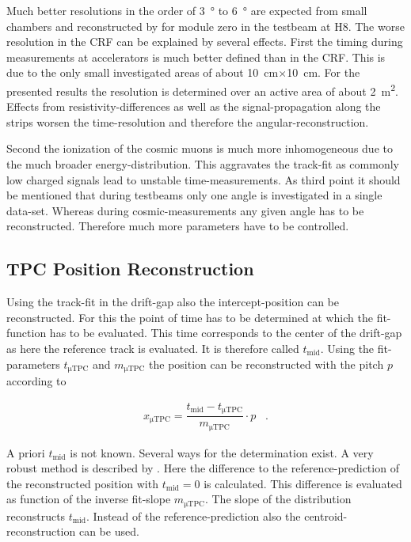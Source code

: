 \documentclass[
twoside,            %
BCOR1.4cm,          %
10pt,               %
headings=normal,    %
headsepline,        %
clearplainpage,		%
final,              %
div=14,
open=right,
bibliography=toc
]{scrreprt}
\begin{document}
Much better resolutions in the order of \SI{3}{\degree} to \SI{6}{\degree} are expected from small chambers \cite{ntekasThesis} and reconstructed by \cite{flierlThesis} for module zero in the testbeam at H8.
The worse resolution in the CRF can be explained by several effects.
First the timing during measurements at accelerators is much better defined than in the CRF.
This is due to the only small investigated areas of about \SI{10}{cm}$\times$\SI{10}{cm}.
For the presented results the resolution is determined over an active area of about \SI{2}{\square\m}.
Effects from resistivity-differences as well as the signal-propagation along the strips worsen the time-resolution and therefore the angular-reconstruction.

Second the ionization of the cosmic muons is much more inhomogeneous due to the much broader energy-distribution.
This aggravates the track-fit as commonly low charged signals lead to unstable time-measurements.
As third point it should be mentioned that during testbeams only one angle is investigated in a single data-set.
Whereas during cosmic-measurements any given angle has to be reconstructed.
Therefore much more parameters have to be controlled.

\subsection{\textmu TPC Position Reconstruction}\label{uTPCposition}

Using the track-fit in the drift-gap also the intercept-position can be reconstructed.
For this the point of time has to be determined at which the fit-function has to be evaluated.
This time corresponds to the center of the drift-gap as here the reference track is evaluated.
It is therefore called $t_{\mathrm{mid}}$.
Using the fit-parameters $t_{\si{\micro}\mathrm{TPC}}$ and $m_{\si{\micro}\mathrm{ TPC}}$ the position can be reconstructed with the pitch $p$ according to

\begin{align}
	x_{\si{\micro}\mathrm{TPC}} = \dfrac{t_{\mathrm{mid}} - t_{\si{\micro}\mathrm{TPC}}}{m_{\si{\micro}\mathrm{ TPC}}} \cdot p \;\;\; .
\end{align}

A priori $t_{\mathrm{mid}}$ is not known.
Several ways for the determination exist.
A very robust method is described by \cite{flierlThesis}. 
Here the difference to the reference-prediction of the reconstructed position with $t_{\mathrm{mid}} = 0$ is calculated.
This difference is evaluated as function of the inverse fit-slope $m_{\si{\micro}\mathrm{ TPC}}$.
The slope of the distribution reconstructs $t_{\mathrm{mid}}$.
Instead of the reference-prediction also the centroid-reconstruction can be used.
\end{document}
